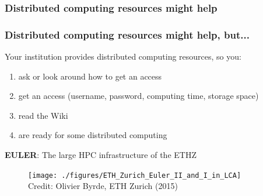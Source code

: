 \documentclass[]{rsuqbeamernew}
\begin{document}
\begin{frame}
\frametitle<1>{Distributed computing resources might help}
\frametitle<2>{Distributed computing resources might help, but...}

\begin{block}{Your institution provides distributed computing resources, so you:}
\begin{enumerate}
  \item ask or look around how to get an access
  \item get an access (username, password, computing time, storage space)
  \item read the Wiki
  \item are ready for some distributed computing 
\end{enumerate}
\end{block}

\begin{block}{\textbf{EULER}: The large HPC infrastructure of the ETHZ}
\begin{figure}[htbp]
  \texttt{[image: ./figures/ETH\_Zurich\_Euler\_II\_and\_I\_in\_LCA]}\\
  {\tiny Credit: Olivier Byrde, ETH Zurich (2015)}
\end{figure}
\end{block}

\end{frame}
\end{document}
